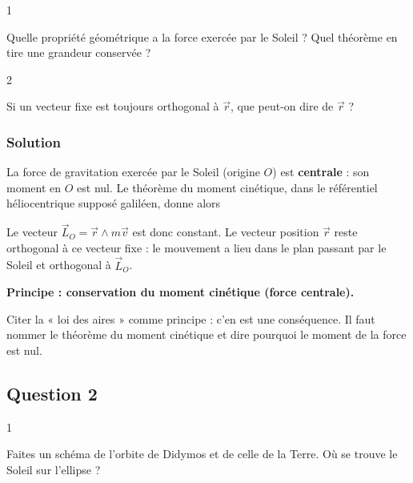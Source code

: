 \documentclass[11pt,a4paper]{article}
\newcommand{\equationajustee}[1]{%
  \sbox{\boiteequation}{$\displaystyle #1$}%
  \ifdim\wd\boiteequation>\linewidth
    \[\resizebox{\linewidth}{!}{\usebox{\boiteequation}}\]%
  \else
    \[#1\]%
  \fi}
\begin{document}
\begin{indication}{1}

Quelle propriété géométrique a la force exercée par le Soleil ? Quel théorème en tire une grandeur conservée ?

\end{indication}

\begin{indication}{2}

Si un vecteur fixe est toujours orthogonal à \(\vec r\), que peut-on dire de \(\vec r\) ?

\end{indication}

\hypertarget{solution}{%
\subsubsection{Solution}\label{solution}}

La force de gravitation exercée par le Soleil (origine \(O\)) est \textbf{centrale} : son moment en \(O\) est nul. Le théorème du moment cinétique, dans le référentiel héliocentrique supposé galiléen, donne alors

\equationajustee{\frac{\mathrm d\vec L_O}{\mathrm dt}=\vec 0 .}

Le vecteur \(\vec L_O=\vec r\wedge m\vec v\) est donc constant. Le vecteur position \(\vec r\) reste orthogonal à ce vecteur fixe : le mouvement a lieu dans le plan passant par le Soleil et orthogonal à \(\vec L_O\).

\textbf{Principe : conservation du moment cinétique (force centrale).}

\begin{piege}

Citer la « loi des aires » comme principe : c'en est une conséquence. Il faut nommer le théorème du moment cinétique et dire pourquoi le moment de la force est nul.

\end{piege}

\hypertarget{question-2}{%
\subsection{Question 2}\label{question-2}}

\begin{indication}{1}

Faites un schéma de l'orbite de Didymos et de celle de la Terre. Où se trouve le Soleil sur l'ellipse ?

\end{indication}
\end{document}
